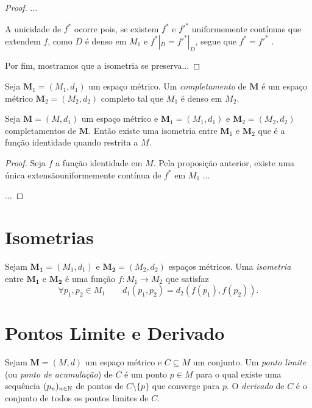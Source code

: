 \begin{proof}
...

	A unicidade de $f^*$ ocorre pois, se existem $f^*$ e $f'^*$ uniformemente contínuas que extendem $f$, como $D$ é denso em $M_1$ e $f^*|_D = f'^*|_D$, segue que $f^* = f'^*$ .
	
	Por fim, mostramos que a isometria se preserva...
\end{proof}

\begin{defi}
	Seja $\bm M_1 = (M_1,d_1)$  um espaço métrico. Um \emph{completamento} de $\bm M$ é um espaço métrico $\bm M_2 = (M_2,d_2)$ completo tal que $M_1$ é denso em $M_2$.
\end{defi}

\begin{prop}
	Seja $\bm M = (M,d_1)$ um espaço métrico e $\bm M_1 = (M_1,d_1)$ e $\bm M_2 = (M_2,d_2)$ completamentos de $\bm M$. Então existe uma isometria entre $\bm M_1$ e $\bm M_2$ que é a função identidade quando restrita a $M$.
\end{prop}
\begin{proof}
	Seja $f$ a função identidade em $M$. Pela proposição anterior, existe uma única extensãouniformemente contínua de $f^*$ em $M_1$ ...
	
	...
\end{proof}


\section{Isometrias}

\begin{defi}
	Sejam $\bm{M_1}=(M_1,d_1)$ e $\bm{M_2}=(M_2,d_2)$ espaços métricos. Uma \emph{isometria} entre $\bm{M_1}$ e $\bm{M_2}$ é uma função $f: M_1 \to M_2$ que satisfaz
	\begin{equation*}
	\forall p_1,p_2 \in M_1 \qquad d_1(p_1,p_2) = d_2(f(p_1),f(p_2)).
	\end{equation*}
\end{defi}


\section{Pontos Limite e Derivado}

\begin{defi}
	Sejam $\bm M = (M,d)$ um espaço métrico e $C \subseteq M$ um conjunto. Um \emph{ponto limite} (ou \emph{ponto de acumulação}) de $C$ é um ponto $p \in M$ para o qual existe uma sequência $(p_n)_{n \in \mathbb{N}}$ de pontos de $C \setminus \{p\}$ que converge para $p$. O \emph{derivado} de $C$ é o conjunto de todos os pontos limites de $C$. 
\end{defi}

